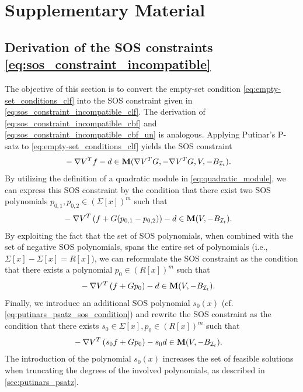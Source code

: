 \section{Supplementary Material}
\label{sec:supplementary_material}

\subsection{Derivation of the SOS constraints \cref{eq:sos_constraint_incompatible}} \label{sec:derive_sos_constr}

The objective of this section is to convert the empty-set condition \cref{eq:empty-set_conditions_clf} into the SOS constraint given in \cref{eq:sos_constraint_incompatible_clf}. The derivation of \cref{eq:sos_constraint_incompatible_cbf} and \cref{eq:sos_constraint_incompatible_cbf_un} is analogous.
Applying Putinar's P-satz to \cref{eq:empty-set_conditions_clf} yields the SOS constraint
\begin{align*}
   &-\nabla V^T f - d \in \textbf M(\nabla V^T G, -\nabla V^T G, V, -B_{\mathcal I_t}).
\end{align*}
By utilizing the definition of a quadratic module in \cref{eq:quadratic_module}, we can express this SOS constraint by the condition that there exist two SOS polynomials $p_{0,1}, p_{0,2} \in (\Sigma[x])^m$ such that
\begin{align*}
   &-\nabla V^T \left ( f + G (p_{0,1} - p_{0,2}) \right ) - d \in \textbf M(V, -B_{\mathcal I_t}).
\end{align*}
By exploiting the fact that the set of SOS polynomials, when combined with the set of negative SOS polynomials, spans the entire set of polynomials (i.e., $\Sigma[x] - \Sigma[x] = R[x]$), we can reformulate the SOS constraint as the condition that there exists a polynomial $p_0 \in (R[x])^m$ such that
\begin{align*}
   &-\nabla V^T \left ( f + G p_0 \right ) - d \in \textbf M(V, -B_{\mathcal I_t}).
\end{align*}
Finally, we introduce an additional SOS polynomial $s_0(x)$ (cf. \cref{eq:putinars_psatz_sos_condition}) and rewrite the SOS constraint as the condition that there exists $s_0 \in \Sigma[x], p_0 \in (R[x])^m$ such that
\begin{align*}
   &-\nabla V^T \left ( s_0 f + G p_0 \right ) - s_0 d \in \textbf M(V, -B_{\mathcal I_t}).
\end{align*}
The introduction of the polynomial $s_0(x)$ increases the set of feasible solutions when truncating the degrees of the involved polynomials, as described in \cref{sec:putinars_psatz}.



